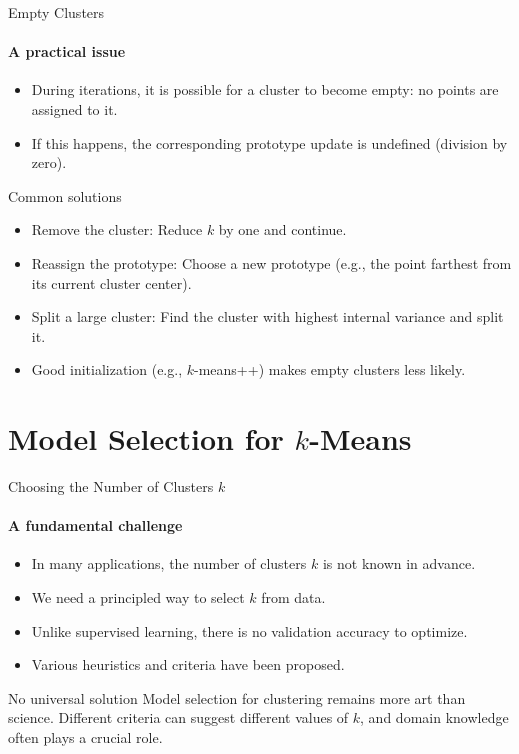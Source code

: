 \begin{frame}{Empty Clusters}
  \framesubtitle{A practical issue}
  \begin{itemize}
    \item During iterations, it is possible for a cluster to become \alert{empty}: no points
          are assigned to it.
    \item If this happens, the corresponding prototype update is undefined (division by zero).
  \end{itemize}
  \begin{block}{Common solutions}
    \begin{itemize}
      \item \alert{Remove the cluster}: Reduce $k$ by one and continue.
      \item \alert{Reassign the prototype}: Choose a new prototype (e.g., the point farthest
            from its current cluster center).
      \item \alert{Split a large cluster}: Find the cluster with highest internal variance
            and split it.
    \end{itemize}
  \end{block}
  \begin{itemize}
    \item Good initialization (e.g., $k$-means++) makes empty clusters less likely.
  \end{itemize}
\end{frame}

\section{Model Selection for $k$-Means}

\begin{frame}{Choosing the Number of Clusters $k$}
  \framesubtitle{A fundamental challenge}
  \begin{itemize}
    \item In many applications, the number of clusters $k$ is \alert{not known in advance}.
    \item We need a principled way to select $k$ from data.
    \item Unlike supervised learning, there is no validation accuracy to optimize.
    \item Various heuristics and criteria have been proposed.
  \end{itemize}
  \begin{alertblock}{No universal solution}
    Model selection for clustering remains more art than science. Different criteria can
    suggest different values of $k$, and domain knowledge often plays a crucial role.
  \end{alertblock}
\end{frame}

